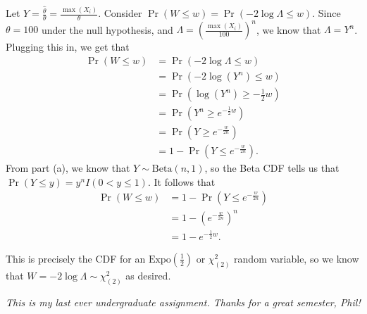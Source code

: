 \documentclass[11pt]{article}
\begin{document}
\begin{enumerate}
\begin{enumerate}[a)]
    Let $Y = \frac{\hat{\theta}}{\theta} = \frac{\max (X_i)}{\theta}$.
    Consider $\Pr( W \leq w) = \Pr (-2 \log \Lambda \leq w)$. Since $\theta = 100$ under the null hypothesis, and $\Lambda = (\frac{\max (X_i)}{100})^n$, we know that $\Lambda = Y^n$. 
    Plugging this in, we get that
    \begin{align*}
        \Pr( W \leq w) &= \Pr (-2 \log \Lambda \leq w) \\
        &= \Pr ( -2\log (Y^n) \leq w) \\
        &= \Pr \left(\log(Y^n) \geq -\frac{1}{2}w\right) \\
        &= \Pr (Y^n \geq e^{-\frac{1}{2}w}) \\
        &= \Pr (Y \geq e^{-\frac{w}{2n}}) \\
        &= 1 - \Pr (Y \leq e^{-\frac{w}{2n}}).
    \end{align*}
    From part (a), we know that $Y \sim \mathrm{Beta}(n, 1)$, so the Beta CDF tells us that $\Pr(Y \leq y) = y^n I(0 < y \leq 1)$. It follows that
    \begin{align*}
        \Pr( W \leq w) &= 1 - \Pr (Y \leq e^{-\frac{w}{2n}}) \\
        &= 1 - (e^{-\frac{w}{2n}})^n \\
        &= 1 - e^{-\frac{1}{2}w}.
    \end{align*}

    This is precisely the CDF for an $\mathrm{Expo}\left(\frac{1}{2}\right)$ or $\chi^{2}_{(2)}$ random variable, so we know that
    $W = -2 \log \Lambda \sim \chi^2_{(2)}$ as desired.  \\
    \end{enumerate}    

\textit{This is my last ever undergraduate assignment. Thanks for a great semester, Phil!}
\end{enumerate}
\end{document}

